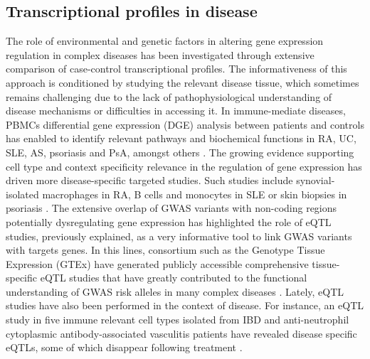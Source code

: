 \subsection{Transcriptional profiles in disease}
The role of environmental and genetic factors in altering gene expression regulation in complex diseases has been investigated through extensive comparison of case-control transcriptional profiles. The informativeness of this approach is conditioned by studying the relevant disease tissue, which sometimes remains challenging due to the lack of pathophysiological understanding of disease mechanisms or difficulties in accessing it. In immune-mediate diseases, PBMCs differential gene expression (DGE) analysis between patients and controls has enabled to identify relevant pathways and biochemical functions in RA, UC, SLE, AS, psoriasis and PsA, amongst others \parencite{Miao2013,Junta2009,Baechler2003,Assassi2010,Batliwalla2005}. The growing evidence supporting cell type and context specificity relevance in the regulation of gene expression has driven more disease-specific targeted studies. Such studies include synovial-isolated macrophages in RA, B cells and monocytes in SLE or skin biopsies in psoriasis \parencite{Katschke2001,Dozmorov2015,Jabbari2012}. The extensive overlap of GWAS variants with non-coding regions potentially dysregulating gene expression has highlighted the role of eQTL studies, previously explained, as a very informative tool to link GWAS variants with targets genes. In this lines, consortium such as the Genotype
Tissue Expression (GTEx) have generated publicly accessible comprehensive tissue-specific eQTL studies that have greatly contributed to the functional understanding of GWAS risk alleles in many complex diseases . Lately, eQTL studies have also been performed in the context of disease. For instance, an eQTL study in five immune relevant cell types isolated from IBD and anti-neutrophil cytoplasmic antibody-associated vasculitis patients have revealed disease specific eQTLs, some of which disappear following treatment \parencite{Peters2016}.

